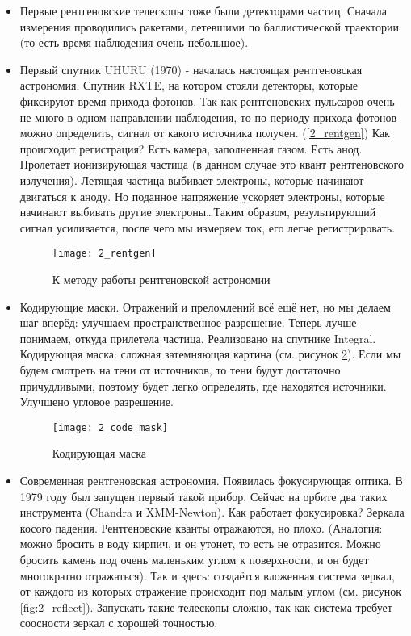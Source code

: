 \begin{itemize}
	\item Первые рентгеновские телескопы тоже были детекторами частиц. Сначала измерения проводились ракетами, летевшими по баллистической траектории (то есть время наблюдения очень небольшое). 
	
	\item Первый спутник UHURU (1970) - началась настоящая рентгеновская астрономия. Спутник RXTE, на котором стояли детекторы, которые фиксируют время прихода фотонов. Так как рентгеновских пульсаров очень не много в одном направлении наблюдения, то по периоду прихода фотонов можно определить, сигнал от какого источника получен. (\ref{2_rentgen}) Как происходит регистрация? Есть камера, заполненная газом. Есть анод. Пролетает ионизирующая частица (в данном случае это квант рентгеновского излучения).  Летящая частица выбивает электроны, которые начинают двигаться к аноду. Но поданное напряжение ускоряет электроны, которые начинают выбивать другие электроны…Таким образом, результирующий сигнал усиливается, после чего мы измеряем ток, его легче регистрировать.
	
	\begin{figure}[H]
		\centering
		\texttt{[image: 2\_rentgen]}
		\caption{К методу работы рентгеновской астрономии}
		\label{fig:2_rentgen}
	\end{figure}
	
	\item Кодирующие маски. Отражений и преломлений всё ещё нет, но мы делаем шаг вперёд: улучшаем пространственное разрешение.  Теперь лучше понимаем, откуда прилетела частица. Реализовано на спутнике Integral. Кодирующая маска: сложная затемняющая картина (см. рисунок \ref{fig:2_code_mask}). Если мы будем смотреть на тени от источников, то тени будут достаточно причудливыми, поэтому будет легко  определять, где находятся источники. Улучшено угловое разрешение.
	
	\begin{figure}[H]
		\centering
		\texttt{[image: 2\_code\_mask]}
		\caption{Кодирующая маска}
		\label{fig:2_code_mask}
	\end{figure}
	
	\item Современная рентгеновская астрономия. Появилась фокусирующая оптика. В 1979 году был запущен первый такой прибор. Сейчас на орбите два таких инструмента (Chandra и XMM-Newton). Как работает фокусировка? Зеркала косого падения. Рентгеновские кванты отражаются, но плохо. (Аналогия: можно бросить в воду кирпич, и он утонет, то есть не отразится. Можно бросить камень под очень маленьким углом к поверхности, и он будет многократно отражаться). Так и здесь: создаётся вложенная система зеркал, от каждого из которых отражение происходит под малым углом (см. рисунок \ref{fig:2_reflect}). Запускать такие телескопы сложно, так как система требует соосности зеркал с хорошей точностью.
	

\end{itemize}
